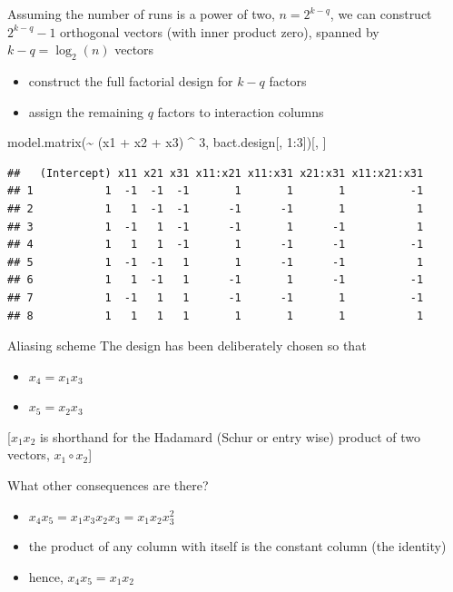 \documentclass[
  ignorenonframetext,
]{beamer}
\newenvironment{Shaded}{\begin{snugshade}}{\end{snugshade}}
\newcommand{\DecValTok}[1]{\textcolor[rgb]{0.00,0.00,0.81}{#1}}
\newcommand{\FunctionTok}[1]{\textcolor[rgb]{0.00,0.00,0.00}{#1}}
\newcommand{\NormalTok}[1]{#1}
\newcommand{\SpecialCharTok}[1]{\textcolor[rgb]{0.00,0.00,0.00}{#1}}
\providecommand{\tightlist}{%
  \setlength{\itemsep}{0pt}\setlength{\parskip}{0pt}}
\begin{document}
\begin{frame}[fragile]{}
\protect\hypertarget{section-11}{}
Assuming the number of runs is a power of two, \(n = 2^{k-q}\), we can
construct \(2^{k-q} -1\) orthogonal vectors (with inner product zero),
spanned by \(k-q = \log_2(n)\) vectors

\begin{itemize}
\tightlist
\item
  construct the full factorial design for \(k-q\) factors
\item
  assign the remaining \(q\) factors to interaction columns
\end{itemize}

\begin{Shaded}
\begin{Highlighting}[]
\FunctionTok{model.matrix}\NormalTok{(}\SpecialCharTok{\textasciitilde{}}\NormalTok{ (x1 }\SpecialCharTok{+}\NormalTok{ x2 }\SpecialCharTok{+}\NormalTok{ x3) }\SpecialCharTok{\^{}} \DecValTok{3}\NormalTok{, bact.design[, }\DecValTok{1}\SpecialCharTok{:}\DecValTok{3}\NormalTok{])[, ]}
\end{Highlighting}
\end{Shaded}

\begin{verbatim}
##   (Intercept) x11 x21 x31 x11:x21 x11:x31 x21:x31 x11:x21:x31
## 1           1  -1  -1  -1       1       1       1          -1
## 2           1   1  -1  -1      -1      -1       1           1
## 3           1  -1   1  -1      -1       1      -1           1
## 4           1   1   1  -1       1      -1      -1          -1
## 5           1  -1  -1   1       1      -1      -1           1
## 6           1   1  -1   1      -1       1      -1          -1
## 7           1  -1   1   1      -1      -1       1          -1
## 8           1   1   1   1       1       1       1           1
\end{verbatim}
\end{frame}

\begin{frame}{Aliasing scheme}
\protect\hypertarget{aliasing-scheme}{}
The design has been deliberately chosen so that

\begin{itemize}
\tightlist
\item
  \(x_4 = x_1x_3\)
\item
  \(x_5 = x_2x_3\)
\end{itemize}

{[}\(x_1x_2\) is shorthand for the Hadamard (Schur or entry wise)
product of two vectors, \(x_1\circ x_2\){]}

What other consequences are there?

\begin{itemize}
\tightlist
\item
  \(x_4x_5 = x_1x_3x_2x_3 = x_1x_2x_3^2\)
\item
  the product of any column with itself is the constant column (the
  identity)
\item
  hence, \(x_4x_5 = x_1x_2\)
\end{itemize}
\end{frame}
\end{document}
